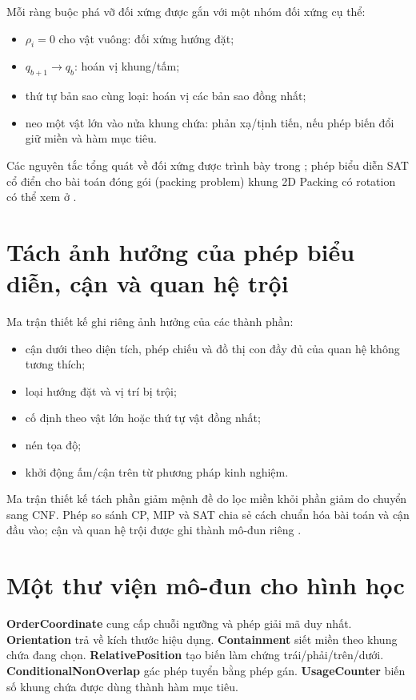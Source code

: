 Mỗi ràng buộc phá vỡ đối xứng được gắn với một nhóm đối xứng cụ thể:
\begin{itemize}
  \item \(\rho_i=0\) cho vật vuông: đối xứng hướng đặt;
  \item \(q_{b+1}\rightarrow q_b\): hoán vị khung/tấm;
  \item thứ tự bản sao cùng loại: hoán vị các bản sao đồng nhất;
  \item neo một vật lớn vào nửa khung chứa: phản xạ/tịnh tiến, nếu phép biến
        đổi giữ miền và hàm mục tiêu.
\end{itemize}
Các nguyên tắc tổng quát về đối xứng được trình bày trong
\textcite{walsh2006symmetry,gent2006symmetry}; phép biểu diễn SAT cổ điển cho bài toán đóng gói (packing problem) khung 2D
Packing có rotation có thể xem ở \textcite{soh2010binpacking}.

\section{Tách ảnh hưởng của phép biểu diễn, cận và quan hệ trội}

Ma trận thiết kế ghi riêng ảnh hưởng của các thành phần:
\begin{itemize}
  \item cận dưới theo diện tích, phép chiếu và đồ thị con đầy đủ của quan hệ
        không tương thích;
  \item loại hướng đặt và vị trí bị trội;
  \item cố định theo vật lớn hoặc thứ tự vật đồng nhất;
  \item nén tọa độ;
  \item khởi động ấm/cận trên từ phương pháp kinh nghiệm.
\end{itemize}

Ma trận thiết kế tách phần giảm mệnh đề do lọc miền khỏi phần giảm do chuyển
sang CNF. Phép so sánh CP, MIP và SAT chia sẻ cách chuẩn hóa bài toán và cận
đầu vào; cận và quan hệ trội được ghi thành mô-đun riêng
\parencite{iori2021packing,clautiaux2007orthogonal}.

\section{Một thư viện mô-đun cho hình học}

\begin{summarybox}
\textbf{OrderCoordinate} cung cấp chuỗi ngưỡng và phép giải mã duy nhất.
\textbf{Orientation} trả về kích thước hiệu dụng.
\textbf{Containment} siết miền theo khung chứa đang chọn.
\textbf{RelativePosition} tạo biến làm chứng trái/phải/trên/dưới.
\textbf{ConditionalNonOverlap} gác phép tuyển bằng phép gán.
\textbf{UsageCounter} biến số khung chứa được dùng thành hàm mục tiêu.
\end{summarybox}

